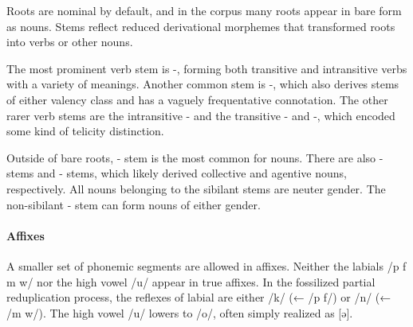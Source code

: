 Roots are nominal by default, and in the corpus many roots appear in bare form as nouns. Stems reflect reduced derivational morphemes that transformed roots into verbs or other nouns.

The most prominent verb stem is -, forming both transitive and intransitive verbs with a variety of meanings. Another common stem is -, which also derives stems of either valency class and has a vaguely frequentative connotation. The other rarer verb stems are the intransitive - and the transitive - and -, which encoded some kind of telicity distinction.

Outside of bare roots, - stem is the most common for nouns. There are also - stems and - stems, which likely derived collective and agentive nouns, respectively. All nouns belonging to the sibilant stems are neuter gender. The non-sibilant - stem can form nouns of either gender.

\paragraph{Affixes}
A smaller set of phonemic segments are allowed in affixes. Neither the labials /p f m w/ nor the high vowel /u/ appear in true affixes. In the fossilized partial reduplication process, the reflexes of labial are either /k/ (← /p f/) or /n/ (← /m w/). The high vowel /u/ lowers to /o/, often simply realized as [ə].